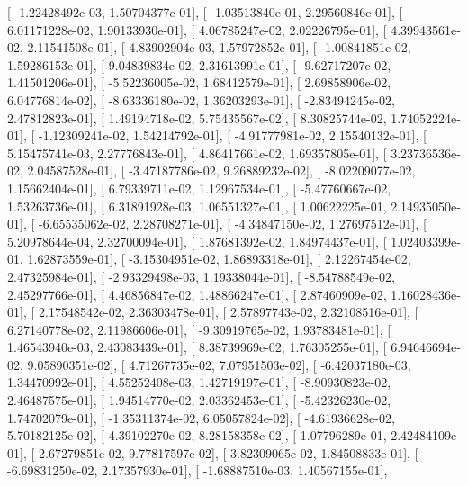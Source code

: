 \documentclass{article}
\begin{document}
       [ -1.22428492e-03,   1.50704377e-01],
       [ -1.03513840e-01,   2.29560846e-01],
       [  6.01171228e-02,   1.90133930e-01],
       [  4.06785247e-02,   2.02226795e-01],
       [  4.39943561e-02,   2.11541508e-01],
       [  4.83902904e-03,   1.57972852e-01],
       [ -1.00841851e-02,   1.59286153e-01],
       [  9.04839834e-02,   2.31613991e-01],
       [ -9.62717207e-02,   1.41501206e-01],
       [ -5.52236005e-02,   1.68412579e-01],
       [  2.69858906e-02,   6.04776814e-02],
       [ -8.63336180e-02,   1.36203293e-01],
       [ -2.83494245e-02,   2.47812823e-01],
       [  1.49194718e-02,   5.75435567e-02],
       [  8.30825744e-02,   1.74052224e-01],
       [ -1.12309241e-02,   1.54214792e-01],
       [ -4.91777981e-02,   2.15540132e-01],
       [  5.15475741e-03,   2.27776843e-01],
       [  4.86417661e-02,   1.69357805e-01],
       [  3.23736536e-02,   2.04587528e-01],
       [ -3.47187786e-02,   9.26889232e-02],
       [ -8.02209077e-02,   1.15662404e-01],
       [  6.79339711e-02,   1.12967534e-01],
       [ -5.47760667e-02,   1.53263736e-01],
       [  6.31891928e-03,   1.06551327e-01],
       [  1.00622225e-01,   2.14935050e-01],
       [ -6.65535062e-02,   2.28708271e-01],
       [ -4.34847150e-02,   1.27697512e-01],
       [  5.20978644e-04,   2.32700094e-01],
       [  1.87681392e-02,   1.84974437e-01],
       [  1.02403399e-01,   1.62873559e-01],
       [ -3.15304951e-02,   1.86893318e-01],
       [  2.12267454e-02,   2.47325984e-01],
       [ -2.93329498e-03,   1.19338044e-01],
       [ -8.54788549e-02,   2.45297766e-01],
       [  4.46856847e-02,   1.48866247e-01],
       [  2.87460909e-02,   1.16028436e-01],
       [  2.17548542e-02,   2.36303478e-01],
       [  2.57897743e-02,   2.32108516e-01],
       [  6.27140778e-02,   2.11986606e-01],
       [ -9.30919765e-02,   1.93783481e-01],
       [  1.46543940e-03,   2.43083439e-01],
       [  8.38739969e-02,   1.76305255e-01],
       [  6.94646694e-02,   9.05890351e-02],
       [  4.71267735e-02,   7.07951503e-02],
       [ -6.42037180e-03,   1.34470992e-01],
       [  4.55252408e-03,   1.42719197e-01],
       [ -8.90930823e-02,   2.46487575e-01],
       [  1.94514770e-02,   2.03362453e-01],
       [ -5.42326230e-02,   1.74702079e-01],
       [ -1.35311374e-02,   6.05057824e-02],
       [ -4.61936628e-02,   5.70182125e-02],
       [  4.39102270e-02,   8.28158358e-02],
       [  1.07796289e-01,   2.42484109e-01],
       [  2.67279851e-02,   9.77817597e-02],
       [  3.82309065e-02,   1.84508833e-01],
       [ -6.69831250e-02,   2.17357930e-01],
       [ -1.68887510e-03,   1.40567155e-01],
\end{document}

